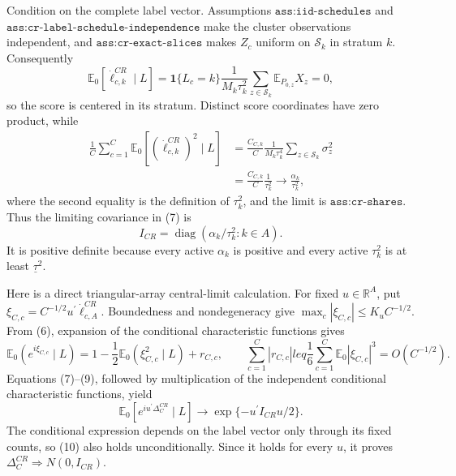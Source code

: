 Condition on the complete label vector.  Assumptions \(\texttt{ass:iid-schedules}\) and \(\texttt{ass:cr-label-schedule-independence}\) make the cluster observations independent, and \(\texttt{ass:cr-exact-slices}\) makes \(Z_c\) uniform on \(\mathcal S_k\) in stratum \(k\).  Consequently
\[
 \mathbb E_0[\dot\ell_{c,k}^{CR}\mid L]
 =\mathbf1\{L_c=k\}\frac1{M_k\tau_k^2}
   \sum_{z\in\mathcal S_k}\mathbb E_{P_{0,z}}X_z=0,            \tag{6}
\]
so the score is centered in its stratum.  Distinct score coordinates have zero product, while
\[
 \begin{aligned}
 \frac1C\sum_{c=1}^C
 \mathbb E_0[(\dot\ell_{c,k}^{CR})^2\mid L]
 &=\frac{C_{C,k}}C\frac1{M_k\tau_k^4}
   \sum_{z\in\mathcal S_k}\sigma_z^2\\
 &=\frac{C_{C,k}}C\frac1{\tau_k^2}
 \longrightarrow\frac{\alpha_k}{\tau_k^2},
 \end{aligned}                                                   \tag{7}
\]
where the second equality is the definition of \(\tau_k^2\), and the limit is \(\texttt{ass:cr-shares}\).  Thus the limiting covariance in (7) is
\[
 I_{CR}=\operatorname{diag}(\alpha_k/\tau_k^2:k\in A).           \tag{8}
\]
It is positive definite because every active \(\alpha_k\) is positive and every active \(\tau_k^2\) is at least \(\underline\tau^2\).

Here is a direct triangular-array central-limit calculation.  For fixed \(u\in\mathbb R^A\), put
\(\xi_{C,c}=C^{-1/2}u^{\prime}\dot\ell_{c,A}^{CR}\).  Boundedness and nondegeneracy give \(\max_c|\xi_{C,c}|\leq K_uC^{-1/2}\).  From (6), expansion of the conditional characteristic functions gives
\[
 \mathbb E_0(e^{i\xi_{C,c}}\mid L)
 =1-\frac12\mathbb E_0(\xi_{C,c}^2\mid L)+r_{C,c},
 \qquad
 \sum_{c=1}^C|r_{C,c}|leq
 \frac16\sum_{c=1}^C\mathbb E_0|\xi_{C,c}|^3=O(C^{-1/2}).       \tag{9}
\]
Equations (7)--(9), followed by multiplication of the independent conditional characteristic functions, yield
\[
 \mathbb E_0\!\left[e^{iu^{\prime}\Delta_C^{CR}}\mid L\right]
 \longrightarrow \exp\{-u^{\prime}I_{CR}u/2\}.                 \tag{10}
\]
The conditional expression depends on the label vector only through its fixed counts, so (10) also holds unconditionally.  Since it holds for every \(u\), it proves
\(\Delta_C^{CR}\Rightarrow N(0,I_{CR})\).

